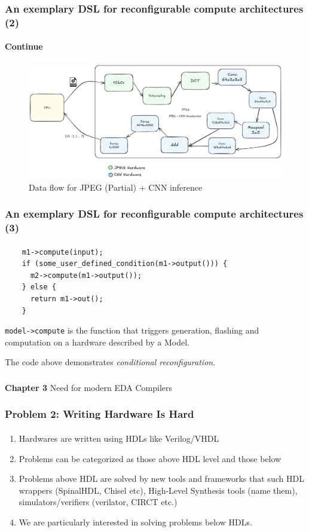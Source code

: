 \documentclass{beamer}
\begin{document}
{\begin{frame}[fragile]
  \frametitle{An exemplary DSL for reconfigurable compute architectures (2)}
\framesubtitle{Continue}
   \begin{figure}
        \centering
        \includegraphics[width=1\linewidth]{images/flowcnnjpeg.png}
        \caption{Data flow for JPEG (Partial) + CNN inference}
    \end{figure}
\end{frame}

\begin{frame}[fragile]
  \frametitle{An exemplary DSL for reconfigurable compute architectures (3)}
\framesubtitle{}
  \begin{verbatim}
    m1->compute(input);
    if (some_user_defined_condition(m1->output())) {
      m2->compute(m1->output());
    } else {
      return m1->out();
    }
\end{verbatim}
  \texttt{model->compute} is the function that triggers generation, flashing and
  computation on a hardware described by a Model.

  The code above demonstrates \textit{conditional reconfiguration}.
\end{frame}

\begin{frame}[c,fragile]
  \frametitle{}

  \centering
  \textbf{Chapter 3} 
  \centering
  Need for modern EDA Compilers
\end{frame}

\newcommand\myheading[1]{%
  \par\bigskip
  {\Large\bfseries#1}\par\smallskip}

 
\begin{frame}[fragile]
  \frametitle{Problem 2: Writing Hardware Is Hard}
  \framesubtitle{}
  \begin{enumerate}
    \item Hardwares are written using HDLs like Verilog/VHDL
    \item Problems can be categorized as those above HDL level and those below
    \item Problems above HDL are solved by new tools and frameworks that
      such HDL wrappers (SpinalHDL, Chisel etc), High-Level Synthesis tools
      (name them), simulators/verifiers (verilator, CIRCT etc.)
    \item We are particularly interested in solving problems below HDLs.


\end{enumerate}
\end{frame}}
\end{document}
